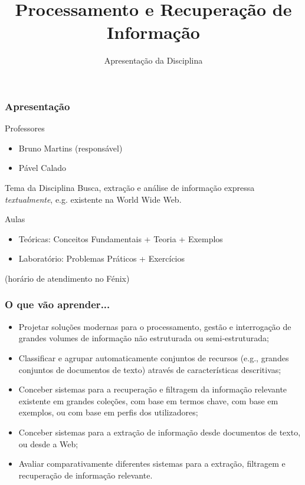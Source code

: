 \documentclass{beamer}
\title{Processamento e Recuperação de Informação}
\subtitle{Apresentação da Disciplina}
\begin{document}
\maketitle

\begin{frame} 
    \frametitle{Apresentação}
    \begin{block}{Professores}
        \begin{itemize}
        \item Bruno Martins (responsável)
        \item Pável Calado
        \end{itemize}
    \end{block}
    \begin{block}{Tema da Disciplina}
        Busca, extração e análise de informação expressa \emph{textualmente}, e.g. existente na World Wide Web.
    \end{block}
    \begin{block}{Aulas}
        \begin{itemize}
        \item Teóricas: Conceitos Fundamentais + Teoria + Exemplos
        \item Laboratório: Problemas Práticos + Exercícios
        \end{itemize}
    \end{block}
    \small\hfill (horário de atendimento no Fénix) 
\end{frame}

\begin{frame} \frametitle{O que vão aprender...}
    \begin{itemize}
	\item Projetar soluções modernas para o processamento, gestão e interrogação de grandes volumes de informação não estruturada ou semi-estruturada;
	\item Classificar e agrupar automaticamente conjuntos de recursos (e.g., grandes conjuntos de documentos de texto) através de características descritivas;
	\item Conceber sistemas para a recuperação e filtragem da informação relevante existente em grandes coleções, com base em termos chave, com base em exemplos, ou com base em perfis dos utilizadores;
	\item Conceber sistemas para a extração de informação desde documentos de texto, ou desde a Web;
	\item Avaliar comparativamente diferentes sistemas para a extração, filtragem e recuperação de informação relevante.	
    \end{itemize}
\end{frame}
\end{document}
